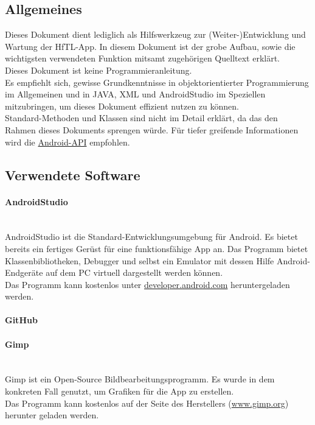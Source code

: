 \subsection{Allgemeines}
Dieses Dokument dient lediglich als Hilfswerkzeug zur (Weiter-)Entwicklung und Wartung der HfTL-App. In diesem Dokument ist der grobe Aufbau, sowie die wichtigsten verwendeten Funktion mitsamt zugehörigen Quelltext erklärt.
\\[1em]
Dieses Dokument ist keine Programmieranleitung.
\\[1em]
Es empfiehlt sich, gewisse Grundkenntnisse in objektorientierter Programmierung im Allgemeinen und  in JAVA, XML und AndroidStudio im Speziellen mitzubringen, um dieses Dokument effizient nutzen zu können.
\\[1em]
Standard-Methoden und Klassen sind nicht im Detail erklärt, da das den Rahmen dieses Dokuments sprengen würde. Für tiefer greifende Informationen wird die \href{http://developer.android.com/reference/packages.html}{Android-API} empfohlen.


\subsection{Verwendete Software}
\paragraph{AndroidStudio}
\ \\[1em]
AndroidStudio ist die Standard-Entwicklungsumgebung für Android. Es bietet bereits ein fertiges Gerüst für eine funktionsfähige App an. Das Programm bietet Klassenbibliotheken, Debugger und selbst ein Emulator mit dessen Hilfe Android-Endgeräte auf dem PC virtuell dargestellt werden können.\\
Das Programm kann kostenlos unter \href{https://developer.android.com/sdk/index.html}{developer.android.com} heruntergeladen werden.



\paragraph{GitHub}
\paragraph{Gimp}
\ \\[1em]
Gimp ist ein Open-Source Bildbearbeitungsprogramm. Es wurde in dem konkreten Fall genutzt, um Grafiken für die App zu erstellen.\\
Das Programm kann kostenlos auf der Seite des Herstellers  (\href{http://www.gimp.org/downloads/}{www.gimp.org}) herunter geladen werden.

